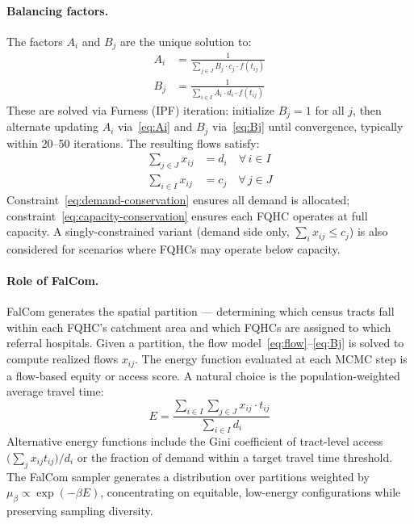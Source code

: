\documentclass[11pt]{article}
\begin{document}
\paragraph{Balancing factors.}
The factors $A_i$ and $B_j$ are the unique solution to:
\begin{align}
    A_i &= \frac{1}{\displaystyle\sum_{j \in J} B_j \cdot c_j \cdot f(t_{ij})}
    \label{eq:Ai} \\[6pt]
    B_j &= \frac{1}{\displaystyle\sum_{i \in I} A_i \cdot d_i \cdot f(t_{ij})}
    \label{eq:Bj}
\end{align}
These are solved via Furness (IPF) iteration: initialize $B_j = 1$ for all $j$, then alternate
updating $A_i$ via~\eqref{eq:Ai} and $B_j$ via~\eqref{eq:Bj} until convergence, typically
within 20--50 iterations. The resulting flows satisfy:
\begin{align}
    \sum_{j \in J} x_{ij} &= d_i \quad \forall\, i \in I
    \label{eq:demand-conservation} \\
    \sum_{i \in I} x_{ij} &= c_j \quad \forall\, j \in J
    \label{eq:capacity-conservation}
\end{align}
Constraint~\eqref{eq:demand-conservation} ensures all demand is allocated;
constraint~\eqref{eq:capacity-conservation} ensures each FQHC operates at full capacity.
A singly-constrained variant (demand side only, $\sum_i x_{ij} \leq c_j$) is also considered
for scenarios where FQHCs may operate below capacity.

\paragraph{Role of FalCom.}
FalCom generates the spatial partition — determining which census tracts fall within each
FQHC's catchment area and which FQHCs are assigned to which referral hospitals. Given a
partition, the flow model~\eqref{eq:flow}--\eqref{eq:Bj} is solved to compute realized flows
$x_{ij}$. The energy function evaluated at each MCMC step is a flow-based equity or access
score. A natural choice is the population-weighted average travel time:
\begin{equation}
    E = \frac{\displaystyle\sum_{i \in I}\sum_{j \in J} x_{ij} \cdot t_{ij}}{\displaystyle\sum_{i \in I} d_i}
    \label{eq:energy}
\end{equation}
Alternative energy functions include the Gini coefficient of tract-level access
$\bigl(\sum_j x_{ij} t_{ij}\bigr)/d_i$ or the fraction of demand within a target travel
time threshold. The FalCom sampler generates a distribution over partitions weighted by
$\mu_\beta \propto \exp(-\beta E)$, concentrating on equitable, low-energy configurations
while preserving sampling diversity.
\end{document}

